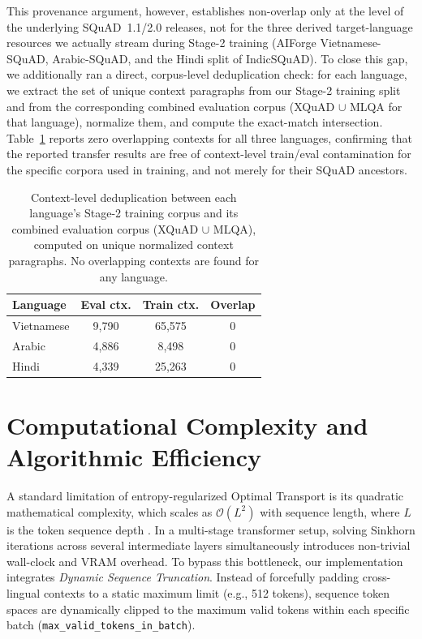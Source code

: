 \documentclass[11pt]{article}
\begin{document}
This provenance argument, however, establishes non-overlap only at the level of the underlying SQuAD~1.1/2.0 releases, not for the three derived target-language resources we actually stream during Stage-2 training (AIForge Vietnamese-SQuAD, Arabic-SQuAD, and the Hindi split of IndicSQuAD). To close this gap, we additionally ran a direct, corpus-level deduplication check: for each language, we extract the set of unique context paragraphs from our Stage-2 training split and from the corresponding combined evaluation corpus (XQuAD $\cup$ MLQA for that language), normalize them, and compute the exact-match intersection. Table~\ref{tab:dedup_check} reports zero overlapping contexts for all three languages, confirming that the reported transfer results are free of context-level train/eval contamination for the specific corpora used in training, and not merely for their SQuAD ancestors.

\begin{table}[ht]
\centering
\small
\begin{tabular}{lccc}
\toprule
\textbf{Language} & \textbf{Eval ctx.} & \textbf{Train ctx.} & \textbf{Overlap} \\
\midrule
Vietnamese & 9{,}790 & 65{,}575 & 0 \\
Arabic & 4{,}886 & 8{,}498 & 0 \\
Hindi & 4{,}339 & 25{,}263 & 0 \\
\bottomrule
\end{tabular}
\caption{Context-level deduplication between each language's Stage-2 training corpus and its combined evaluation corpus (XQuAD $\cup$ MLQA), computed on unique normalized context paragraphs. No overlapping contexts are found for any language.}
\label{tab:dedup_check}
\end{table}

\section{Computational Complexity and Algorithmic Efficiency}
\label{sec:appendix_complexity}
A standard limitation of entropy-regularized Optimal Transport is its quadratic mathematical complexity, which scales as $\mathcal{O}(L^2)$ with sequence length, where $L$ is the token sequence depth \citep{2999792.2999868}. In a multi-stage transformer setup, solving Sinkhorn iterations across several intermediate layers simultaneously introduces non-trivial wall-clock and VRAM overhead. To bypass this bottleneck, our implementation integrates \textit{Dynamic Sequence Truncation}. Instead of forcefully padding cross-lingual contexts to a static maximum limit (e.g., 512 tokens), sequence token spaces are dynamically clipped to the maximum valid tokens within each specific batch (\texttt{max\_valid\_tokens\_in\_batch}).
\end{document}
